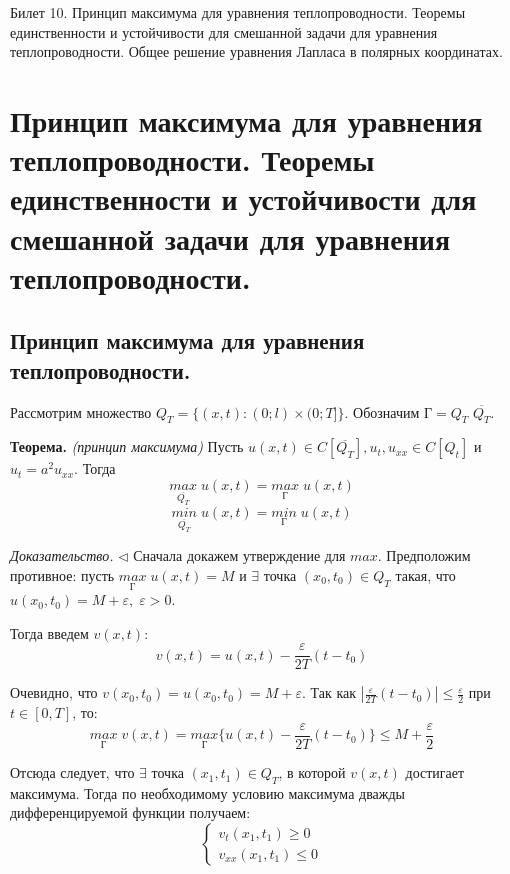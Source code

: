 \documentclass[11pt,a4paper]{article}
\begin{document}
    \LARGE Билет 10. Принцип максимума для уравнения теплопроводности. Теоремы единственности и устойчивости для смешанной задачи для уравнения теплопроводности. Общее решение уравнения Лапласа в полярных координатах.
    \section{Принцип максимума для уравнения теплопроводности. Теоремы единственности и устойчивости для смешанной задачи для уравнения теплопроводности.}
    \subsection{Принцип максимума для уравнения теплопроводности.}
    
    Рассмотрим множество $Q_T = \{(x, t) : (0; l) × (0; T]\}$. Обозначим $Г = Q_T$ $\overline{Q_T}$.
    \par
    \textbf{Теорема.} \textit{(принцип максимума)} Пусть $u(x,t) \in C[\overline{Q_T}], u_t, u_{xx} \in C[Q_t]$ и $u_t = a^2u_{xx}$. Тогда
    $$
    \underset{\overline{Q_T}}{max} \; u(x,t) = \underset{Г}{max} \; u(x,t)
    $$
    $$
    \underset{\overline{Q_T}}{min} \; u(x,t) = \underset{Г}{min} \; u(x,t)
    $$
    
    \textit{Доказательство.} $\triangleleft$ Сначала докажем утверждение для $max$. Предположим противное: пусть $\underset{Г}{max} \; u(x,t) = M$ и $\exists$ точка $(x_0,t_0) \in Q_T$ такая, что $u(x_0,t_0)= M + \varepsilon, \; \varepsilon > 0$.
    \par
    Тогда введем $v(x,t)$:
    \begin{equation}
        \label{eq1}
        v(x,t) = u(x,t) - \frac{\varepsilon}{2T}(t - t_0)
    \end{equation}
    
    Очевидно, что $v(x_0,t_0) = u(x_0,t_0) = M + \varepsilon$. Так как $|\frac{\varepsilon}{2T}(t - t_0)| \leq \frac{\varepsilon}{2}$ при $t \in [0,T]$, то:
    $$
    \underset{Г}{max} \; v(x,t) = \underset{Г}{max} \{u(x,t) - \frac{\varepsilon}{2T}(t - t_0)\} \leqslant M + \frac{\varepsilon}{2}
    $$
    
    Отсюда следует, что $\exists$ точка $(x_1,t_1) \in Q_T$, в которой $v(x,t)$ достигает максимума. Тогда по необходимому условию максимума дважды дифференцируемой функции получаем:
    \begin{equation}
        \label{eq2}
        \begin{cases}
        v_t(x_1,t_1) \geqslant 0 \\
        v_{xx}(x_1,t_1) \leqslant 0
        \end{cases}
    \end{equation}
    
\end{document}
